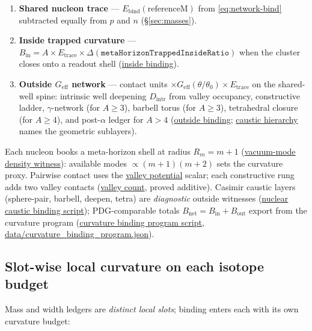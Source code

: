 \documentclass[11pt,notitlepage]{amsart}
\newcommand{\datafile}[1]{{\footnotesize\url{data/#1}}}
\begin{document}
\begin{enumerate}[leftmargin=2em]
\item \textbf{Shared nucleon trace} --- $E_{\mathrm{bind}}(\mathrm{referenceM})$
  from \eqref{eq:network-bind} subtracted equally from $p$ and $n$
  (\S\ref{sec:masses}).
\item \textbf{Inside trapped curvature} --- $B_{\mathrm{in}}=A\times E_{\mathrm{trace}}
  \times\Delta(\texttt{metaHorizonTrappedInsideRatio})$ when the cluster closes onto a
  readout shell (\hyperref[lean:nuclear-curvature-binding]{inside binding}).
\item \textbf{Outside $G_{\mathrm{eff}}$ network} --- contact units $\times
  G_{\mathrm{eff}}(\theta/\theta_0)\times E_{\mathrm{trace}}$ on the shared-well spine:
  intrinsic well deepening $D_{\mathrm{intr}}$ from valley occupancy, constructive ladder,
  $\gamma$-network (for $A\ge 3$), barbell torus (for $A\ge 3$), tetrahedral closure
  (for $A\ge 4$), and post-$\alpha$ ledger for $A>4$
  (\hyperref[lean:nuclear-curvature-binding]{outside binding};
  \hyperref[lean:casimir-caustic-stack]{caustic hierarchy} names the geometric sublayers).
\end{enumerate}

Each nucleon books a meta-horizon shell at radius $R_m=m+1$
(\hyperref[lean:hqiv-nuclei]{vacuum-mode density witness}): available modes
$\propto(m+1)(m+2)$ sets the curvature proxy. Pairwise contact uses the
\hyperref[lean:hqiv-nuclei]{valley potential} scalar; each constructive rung adds two
valley contacts (\hyperref[lean:hqiv-nuclei-valley-scaffold]{valley count}, proved
additive). Casimir caustic layers (sphere-pair, barbell, deepen, tetra) are
\emph{diagnostic} outside witnesses
(\hyperref[script:nuclear-caustic]{nuclear caustic binding script}); PDG-comparable
totals $B_{\mathrm{net}}=B_{\mathrm{in}}+B_{\mathrm{out}}$ export from the curvature
program (\hyperref[script:curvature-binding]{curvature binding program script},
\datafile{curvature_binding_program.json}).

\subsection{Slot-wise local curvature on each isotope budget}

Mass and width ledgers are \emph{distinct local slots}; binding enters each with its
own curvature budget:
\end{document}
